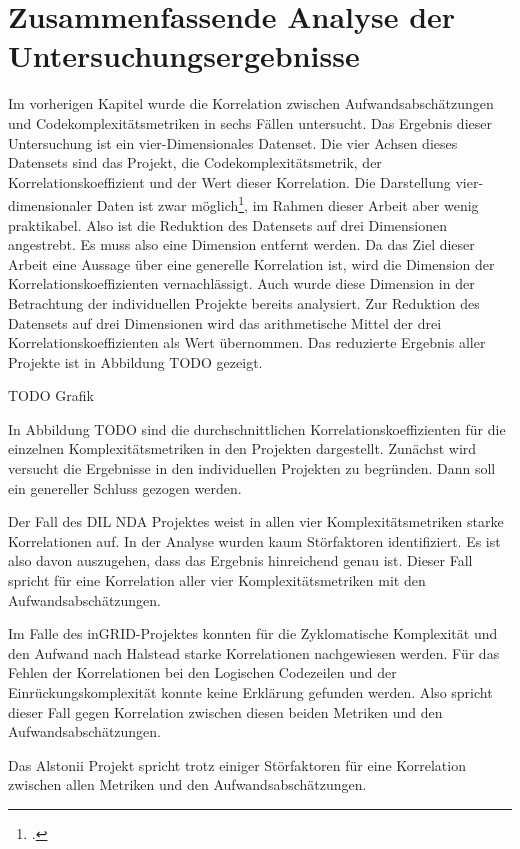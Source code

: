 \chapter{Zusammenfassende Analyse der Untersuchungsergebnisse}\label{zusammenfassende-analyse-der-untersuchungsergebnisse}

Im vorherigen Kapitel wurde die Korrelation zwischen
Aufwandsabschätzungen und Codekomplexitätsmetriken in sechs Fällen
untersucht. Das Ergebnis dieser Untersuchung ist ein vier-Dimensionales
Datenset. Die vier Achsen dieses Datensets sind das Projekt, die
Codekomplexitätsmetrik, der Korrelationskoeffizient und der Wert dieser
Korrelation. Die Darstellung vier-dimensionaler Daten ist zwar
möglich\footcite{sarkarArtEffectiveVisualization2021}, im Rahmen dieser
Arbeit aber wenig praktikabel. Also ist die Reduktion des Datensets auf
drei Dimensionen angestrebt. Es muss also eine Dimension entfernt
werden. Da das Ziel dieser Arbeit eine Aussage über eine generelle
Korrelation ist, wird die Dimension der Korrelationskoeffizienten
vernachlässigt. Auch wurde diese Dimension in der Betrachtung der
individuellen Projekte bereits analysiert. Zur Reduktion des Datensets
auf drei Dimensionen wird das arithmetische Mittel der drei
Korrelationskoeffizienten als Wert übernommen. Das reduzierte Ergebnis
aller Projekte ist in Abbildung TODO gezeigt.

TODO Grafik

In Abbildung TODO sind die durchschnittlichen
Korrelationskoeffizienten für die einzelnen Komplexitätsmetriken in den
Projekten dargestellt. Zunächst wird versucht die Ergebnisse in den
individuellen Projekten zu begründen. Dann soll ein genereller Schluss
gezogen werden.

Der Fall des DIL NDA Projektes weist in allen vier Komplexitätsmetriken
starke Korrelationen auf. In der Analyse wurden kaum Störfaktoren
identifiziert. Es ist also davon auszugehen, dass das Ergebnis
hinreichend genau ist. Dieser Fall spricht für eine Korrelation aller
vier Komplexitätsmetriken mit den Aufwandsabschätzungen.

Im Falle des inGRID-Projektes konnten für die Zyklomatische Komplexität
und den Aufwand nach Halstead starke Korrelationen nachgewiesen werden.
Für das Fehlen der Korrelationen bei den Logischen Codezeilen und der
Einrückungskomplexität konnte keine Erklärung gefunden werden. Also
spricht dieser Fall gegen Korrelation zwischen diesen beiden Metriken
und den Aufwandsabschätzungen.

Das Alstonii Projekt spricht trotz einiger Störfaktoren für eine Korrelation
zwischen allen Metriken und den Aufwandsabschätzungen.

